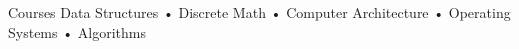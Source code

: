 

\begin{cvscourses}
  \cvscourses
    {Courses} %
    {Data Structures • Discrete Math • Computer Architecture • Operating Systems • Algorithms} %

\end{cvscourses}
